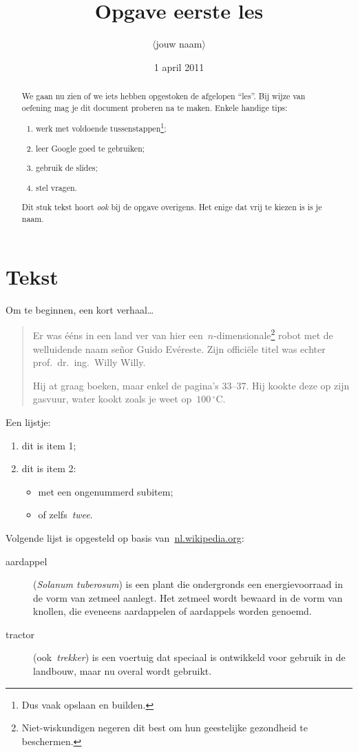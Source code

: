 \documentclass[a4paper]{article}
\title{Opgave eerste les}
\author{$\langle$jouw naam$\rangle$}
\date{1 april 2011}
\newcommand\dash{\nobreakdash-\hspace{0pt}}
\begin{document}
\maketitle
\begin{abstract}
  We gaan nu zien of we iets hebben opgestoken de afgelopen ``les''. Bij wijze van oefening mag je dit document proberen na te maken. Enkele handige tips:
  \begin{enumerate}
    \item werk met voldoende tussenstappen\footnote{Dus vaak opslaan en builden.};
	\item leer Google goed te gebruiken;
	\item gebruik de slides;
	\item stel vragen.
  \end{enumerate}

  Dit stuk tekst hoort \emph{ook} bij de opgave overigens. Het enige dat vrij te kiezen is is je naam.
\end{abstract}

\tableofcontents
\clearpage

\section{Tekst}
Om te beginnen, een kort verhaal\ldots

\begin{quotation}
  Er was \'e\'ens in een land ver van hier een~$n$\dash dimensionale\footnote{Niet-wiskundigen negeren dit best om hun geestelijke gezondheid te beschermen.} robot met de welluidende naam se\~nor Guido Ev\'ereste. Zijn offici\"ele titel was echter prof.~dr.~ing.~Willy Willy.
  
  Hij at graag boeken, maar enkel de pagina's 33--37. Hij kookte deze op zijn gasvuur, water kookt zoals je weet op~$100\,^\circ\mathrm{C}$.
\end{quotation}
Een lijstje:
\begin{enumerate}
  \item dit is item 1;
  \item dit is item 2:
    \begin{itemize}
  	\item met een ongenummerd subitem;
  	\item of zelfs~\emph{twee}.
  \end{itemize}
\end{enumerate}

Volgende lijst is opgesteld op basis van~\href{http://nl.wikipedia.org}{nl.wikipedia.org}:
\begin{description}
  \item[aardappel] (\emph{Solanum tuberosum}) is een plant die ondergronds een energievoorraad in de vorm van zetmeel aanlegt. Het zetmeel wordt bewaard in de vorm van knollen, die eveneens aardappelen of aardappels worden genoemd. 
  \item[tractor] (ook~\emph{trekker}) is een voertuig dat speciaal is ontwikkeld voor gebruik in de landbouw, maar nu overal wordt gebruikt. 
\end{description}
\end{document}
